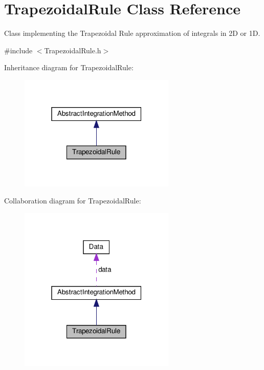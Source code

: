 \hypertarget{class_trapezoidal_rule}{}\section{Trapezoidal\+Rule Class Reference}
\label{class_trapezoidal_rule}


Class implementing the Trapezoidal Rule approximation of integrals in 2D or 1D.  




{\ttfamily \#include $<$Trapezoidal\+Rule.\+h$>$}



Inheritance diagram for Trapezoidal\+Rule\+:\nopagebreak
\begin{figure}[H]
\begin{center}
\leavevmode
\includegraphics[width=211pt]{class_trapezoidal_rule__inherit__graph}
\end{center}
\end{figure}


Collaboration diagram for Trapezoidal\+Rule\+:\nopagebreak
\begin{figure}[H]
\begin{center}
\leavevmode
\includegraphics[width=211pt]{class_trapezoidal_rule__coll__graph}
\end{center}
\end{figure}
